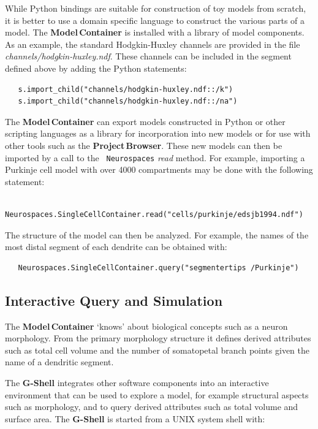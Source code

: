 \documentclass[12pt]{article}
\begin{document}
While Python bindings are suitable for construction of toy models from
scratch, it is better to use a domain specific language to construct
the various parts of a model. The {\bf Model\,Container} is
installed with a library of model components.  As an example, the
standard Hodgkin-Huxley channels are provided in the file {\it
  channels/hodgkin-huxley.ndf}.  These channels can be included in the
segment defined above by adding the Python statements:

{\footnotesize
\begin{verbatim}
   s.import_child("channels/hodgkin-huxley.ndf::/k")
   s.import_child("channels/hodgkin-huxley.ndf::/na")
\end{verbatim}
}

The {\bf Model\,Container} can export models constructed in Python or other
scripting languages as a library for incorporation into new models or
for use with other tools such as the {\bf Project\,Browser}.
These new models can then be imported by a call to the {\tt
  Neurospaces} {\it read} method. For example, importing a Purkinje
cell model with over 4000 compartments may be done with the following
statement:

{\footnotesize
\begin{verbatim}
   Neurospaces.SingleCellContainer.read("cells/purkinje/edsjb1994.ndf")
\end{verbatim}
}

The structure of the model can then be analyzed.  For example, the
names of the most distal segment of each dendrite can be obtained
with:

{\footnotesize
\begin{verbatim}
   Neurospaces.SingleCellContainer.query("segmentertips /Purkinje")
\end{verbatim}
}

\subsection{Interactive Query and Simulation}

The {\bf Model\,Container} `knows' about biological concepts such as a neuron
morphology.  From the primary morphology structure it defines derived
attributes such as total cell volume and the number of somatopetal
branch points given the name of a dendritic segment.

The {\bf G-Shell} integrates other software components into an
interactive environment that can be used to explore a
model, for example structural aspects such as morphology, and to query
derived attributes such as total volume and surface area.  The {\bf
  G-Shell} is started from a UNIX system shell with:
\end{document}

